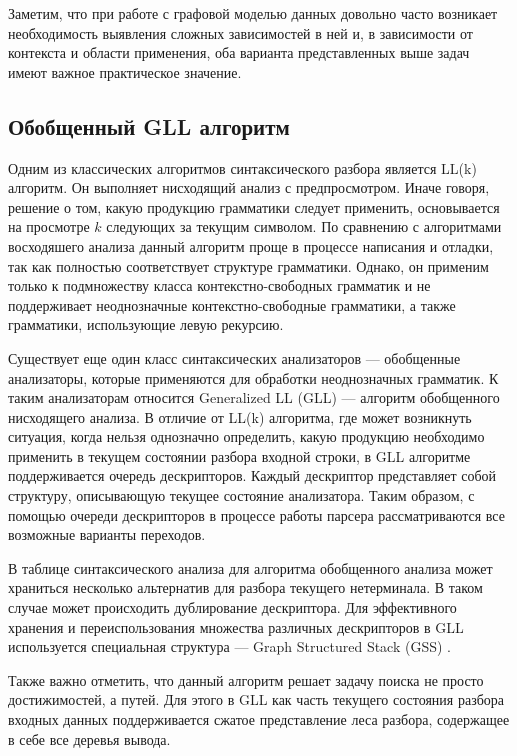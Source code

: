 \documentclass[14pt]{matmex-diploma-custom}
\theoremstyle{definition}
\begin{document}
Заметим, что при работе с графовой моделью данных довольно часто возникает необходимость выявления сложных зависимостей в ней и, в зависимости от контекста и области применения, оба варианта представленных выше задач имеют важное практическое значение.

\subsection{Обобщенный GLL алгоритм}
Одним из классических алгоритмов синтаксического разбора является LL(k) алгоритм. Он выполняет нисходящий анализ с предпросмотром. Иначе говоря, решение о том, какую продукцию грамматики следует применить, основывается на просмотре $k$ следующих за текущим символом. По сравнению с алгоритмами восходяшего анализа данный алгоритм проще в процессе написания и отладки, так как полностью соответствует структуре грамматики. Однако, он применим только к подмножеству класса контекстно-свободных грамматик и не поддерживает неоднозначные контекстно-свободные грамматики, а также грамматики, использующие левую рекурсию.

Существует еще один класс синтаксических анализаторов --- обобщенные анализаторы, которые применяются для обработки неоднозначных грамматик. К таким анализаторам относится Generalized LL (GLL) --- алгоритм обобщенного нисходящего анализа. 
В отличие от LL(k) алгоритма, где может возникнуть ситуация, когда нельзя однозначно определить, какую продукцию необходимо применить в текущем состоянии разбора входной строки, в GLL алгоритме поддерживается очередь дескрипторов. Каждый дескриптор представляет собой структуру, описывающую текущее состояние анализатора. Таким образом, с помощью очереди дескрипторов в процессе работы парсера рассматриваются все возможные варианты переходов.

В таблице синтаксического анализа для алгоритма обобщенного анализа может храниться несколько альтернатив для разбора текущего нетерминала. В таком случае может происходить дублирование дескриптора. Для эффективного хранения  и переиспользования множества различных дескрипторов в GLL используется специальная структура --- Graph Structured Stack (GSS) \cite{10.5555/1623611.1623625}.

Также важно отметить, что данный алгоритм решает задачу поиска не просто достижимостей, а путей. Для этого в GLL как часть текущего состояния разбора входных данных поддерживается сжатое представление леса разбора, содержащее в себе все деревья вывода. 
\end{document}
